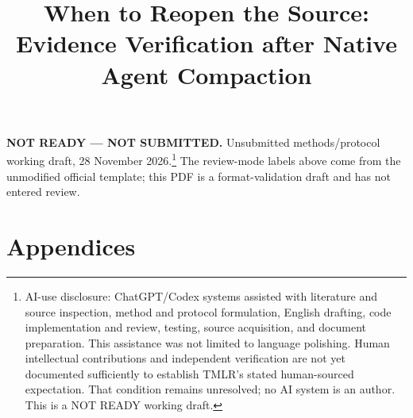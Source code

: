 \documentclass[10pt]{article}
\title{When to Reopen the Source: Evidence Verification after Native Agent Compaction}
\author{}
\begin{document}
\maketitle
\textbf{NOT READY --- NOT SUBMITTED.} Unsubmitted methods/protocol working draft,
28 November 2026.\footnote{AI-use disclosure: ChatGPT/Codex systems assisted with literature and source inspection, method and protocol formulation, English drafting, code implementation and review, testing, source acquisition, and document preparation. This assistance was not limited to language polishing. Human intellectual contributions and independent verification are not yet documented sufficiently to establish TMLR's stated human-sourced expectation. That condition remains unresolved; no AI system is an author. This is a NOT READY working draft.}
The review-mode labels above come from the unmodified official template;
this PDF is a format-validation draft and has not entered review.
\begin{abstract}

\end{abstract}


\clearpage


\clearpage
\section*{Appendices}
\appendix

\end{document}
